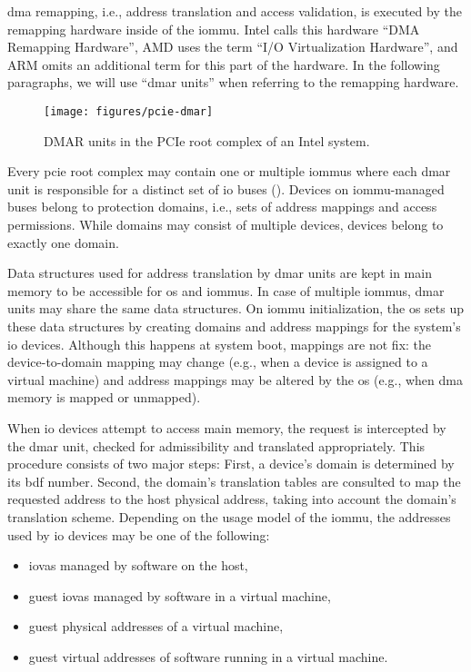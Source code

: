 \ac{dma} remapping, i.e., address translation and access validation, is executed
by the remapping hardware inside of the \ac{iommu}. Intel calls this hardware
``DMA Remapping Hardware'', AMD uses the term ``I/O Virtualization Hardware'',
and ARM omits an additional term for this part of the hardware. In the following
paragraphs, we will use ``\acs{dmar} units'' when referring to the remapping
hardware.

\begin{figure} \centering
    \texttt{[image: figures/pcie-dmar]}
    \caption{DMAR units in the PCIe root complex of an Intel system.}
    \label{fig:pcie-dmar}
\end{figure}

Every \ac{pcie} root complex may contain one or multiple \acp{iommu} where each
\ac{dmar} unit is responsible for a distinct set of \ac{io} buses
(). Devices on \ac{iommu}-managed buses belong to protection
domains, i.e., sets of address mappings and access permissions. While domains
may consist of multiple devices, devices belong to exactly one domain.

Data structures used for address translation by \ac{dmar} units are kept in main
memory to be accessible for \ac{os} and \acp{iommu}. In case of multiple
\acp{iommu}, \ac{dmar} units may share the same data structures. On \ac{iommu}
initialization, the \ac{os} sets up these data structures by creating domains
and address mappings for the system's \ac{io} devices. Although this happens at
system boot, mappings are not fix: the device-to-domain mapping may change
(e.g., when a device is assigned to a virtual machine) and address mappings may
be altered by the \ac{os} (e.g., when \ac{dma} memory is mapped or unmapped).

When \ac{io} devices attempt to access main memory, the request is intercepted
by the \ac{dmar} unit, checked for admissibility and translated appropriately.
This procedure consists of two major steps: First, a device's domain is
determined by its \ac{bdf} number. Second, the domain's translation tables are
consulted to map the requested address to the host physical address, taking into
account the domain's translation scheme. Depending on the usage model of the
\ac{iommu}, the addresses used by \ac{io} devices may be one of the following:

\begin{itemize}
    \item \acp{iova} managed by software on the host,
    \item guest \acp{iova} managed by software in a virtual machine,
    \item guest physical addresses of a virtual machine,
    \item guest virtual addresses of software running in a virtual machine.
\end{itemize}

